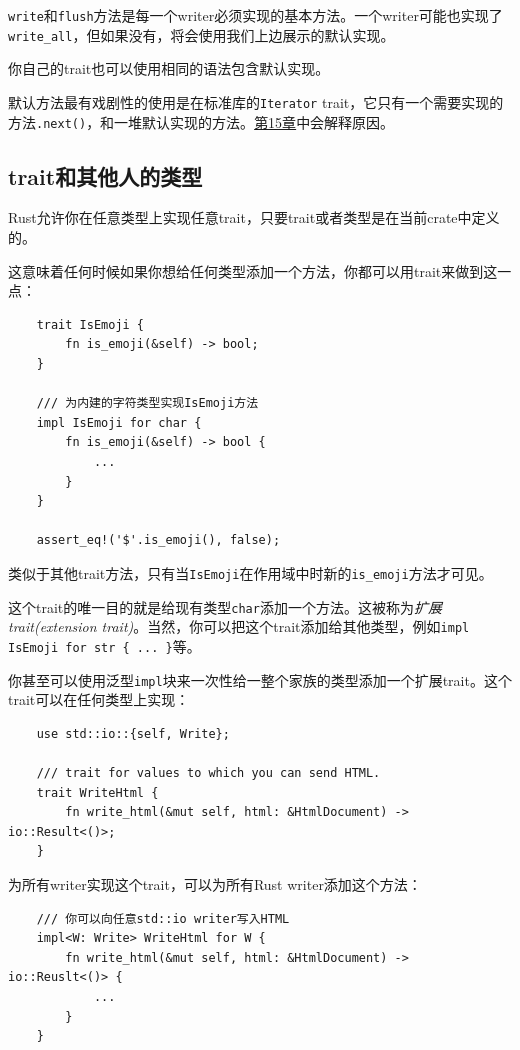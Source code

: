 \texttt{write}和\texttt{flush}方法是每一个writer必须实现的基本方法。一个writer可能也实现了\texttt{write\_all}，但如果没有，将会使用我们上边展示的默认实现。

你自己的trait也可以使用相同的语法包含默认实现。

默认方法最有戏剧性的使用是在标准库的\texttt{Iterator} trait，它只有一个需要实现的方法\texttt{.next()}，和一堆默认实现的方法。\hyperref[ch15]{第15章}中会解释原因。

\subsection{trait和其他人的类型}
Rust允许你在任意类型上实现任意trait，只要trait或者类型是在当前crate中定义的。

这意味着任何时候如果你想给任何类型添加一个方法，你都可以用trait来做到这一点：
\begin{verbatim}
    trait IsEmoji {
        fn is_emoji(&self) -> bool;
    }

    /// 为内建的字符类型实现IsEmoji方法
    impl IsEmoji for char {
        fn is_emoji(&self) -> bool {
            ...
        }
    }

    assert_eq!('$'.is_emoji(), false);
\end{verbatim}

类似于其他trait方法，只有当\texttt{IsEmoji}在作用域中时新的\texttt{is\_emoji}方法才可见。

这个trait的唯一目的就是给现有类型\texttt{char}添加一个方法。这被称为\emph{扩展trait(extension trait)}。当然，你可以把这个trait添加给其他类型，例如\texttt{impl IsEmoji for str \{ ... \}}等。

你甚至可以使用泛型\texttt{impl}块来一次性给一整个家族的类型添加一个扩展trait。这个trait可以在任何类型上实现：
\begin{verbatim}
    use std::io::{self, Write};

    /// trait for values to which you can send HTML.
    trait WriteHtml {
        fn write_html(&mut self, html: &HtmlDocument) -> io::Result<()>;
    }
\end{verbatim}

为所有writer实现这个trait，可以为所有Rust writer添加这个方法：
\begin{verbatim}
    /// 你可以向任意std::io writer写入HTML
    impl<W: Write> WriteHtml for W {
        fn write_html(&mut self, html: &HtmlDocument) -> io::Reuslt<()> {
            ...
        }
    }
\end{verbatim}

